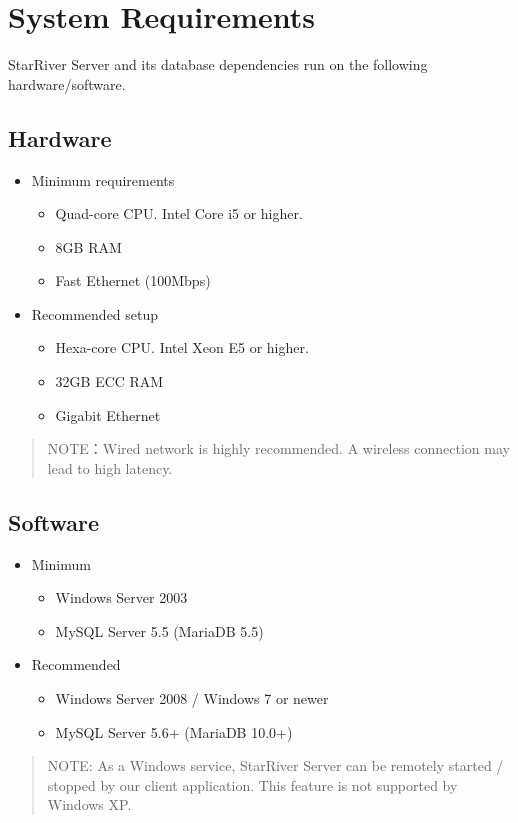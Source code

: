 \section{System Requirements}\label{system-requirements}

StarRiver Server and its database dependencies run on the following
hardware/software.

\subsection{Hardware}\label{hardware}

\begin{itemize}
\itemsep1pt\parskip0pt
\item
  Minimum requirements

  \begin{itemize}
  \itemsep1pt\parskip0pt
  \item
    Quad-core CPU. Intel Core i5 or higher.
  \item
    8GB RAM
  \item
    Fast Ethernet (100Mbps)
  \end{itemize}
\item
  Recommended setup

  \begin{itemize}
  \itemsep1pt\parskip0pt
  \item
    Hexa-core CPU. Intel Xeon E5 or higher.
  \item
    32GB ECC RAM
  \item
    Gigabit Ethernet
  \end{itemize}
\end{itemize}

\begin{quote}
NOTE：Wired network is highly recommended. A wireless connection may
lead to high latency.
\end{quote}

\subsection{Software}\label{software}

\begin{itemize}
\itemsep1pt\parskip0pt
\item
  Minimum

  \begin{itemize}
  \itemsep1pt\parskip0pt
  \item
    Windows Server 2003
  \item
    MySQL Server 5.5 (MariaDB 5.5)
  \end{itemize}
\item
  Recommended

  \begin{itemize}
  \itemsep1pt\parskip0pt
  \item
    Windows Server 2008 / Windows 7 or newer
  \item
    MySQL Server 5.6+ (MariaDB 10.0+)
  \end{itemize}
\end{itemize}

\begin{quote}
NOTE: As a Windows service, StarRiver Server can be remotely started /
stopped by our client application. This feature is not supported by
Windows XP.
\end{quote}
